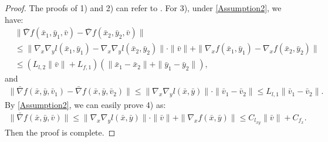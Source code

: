 \documentclass{article}
\theoremstyle{plain}
\theoremstyle{definition}
\theoremstyle{remark}
\begin{document}
\begin{proof}
The proofs of 1) and 2) can refer to \citep{ghadimi2018approximation}. For 3), under \cref{Assumption2}, we have:
\begin{align}
   &\|\bar{\nabla} f(\bar{x}_1, \bar{y}_1, \bar{v}) - \bar{\nabla} f(\bar{x}_2, \bar{y}_2, \bar{v})\| \nonumber\\
&\leq \|\nabla_{{x}}\nabla_{{y}} l(\bar{x}_1, \bar{y}_1) - \nabla_{{x}}\nabla_{{y}} l(\bar{x}_2, \bar{y}_2)\| \cdot \|\bar{v}\|
+ \|\nabla_{{x}} f(\bar{x}_1, \bar{y}_1) - \nabla_{{x}} f(\bar{x}_2, \bar{y}_2)\| \nonumber\\
&\leq (L_{l,2} \|\bar{v}\| + L_{f,1})(\|\bar{x}_1 - \bar{x}_2\| + \|\bar{y}_1 - \bar{y}_2\|),\label{eq22}
\end{align}
and
\begin{align}
\|\bar{\nabla} f(\bar{x}, \bar{y}, \bar{v}_1) - \bar{\nabla} f(\bar{x}, \bar{y}, \bar{v}_2)\| 
\leq \|\nabla_{{x}} \nabla_{{y}} l(\bar{x}, \bar{y})\| \cdot \|\bar{v}_1 - \bar{v}_2\| 
\leq L_{l,1} \|\bar{v}_1 - \bar{v}_2\|.\label{eq23}
\end{align}
By \cref{Assumption2}, we can easily prove 4) as:
\begin{align}
\|\bar{\nabla} f(\bar{x}, \bar{y}, \bar{v})\| \leq \|\nabla_{{x}} \nabla_{{y}} l(\bar{x}, \bar{y})\| \cdot \|\bar{v}\| + \|\nabla_{{x}} f(\bar{x}, \bar{y})\| 
\leq C_{l_{xy}} \|\bar{v}\| + C_{f_x}.\label{eq24}
\end{align}
Then the proof is complete.
\end{proof} 
\end{document}
